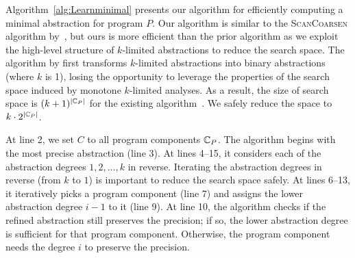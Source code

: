 Algorithm~\ref{alg:Learnminimal} presents our algorithm for efficiently computing a minimal abstraction for program $P$.
Our algorithm is similar to the \textsc{ScanCoarsen} algorithm by~\cite{Liang2011learning}, but ours is more efficient than the prior algorithm as we exploit the high-level structure of $k$-limited abstractions to reduce the search space.
The algorithm by \cite{Liang2011learning} first transforms $k$-limited abstractions into binary abstractions (where $k$ is 1), losing the opportunity to leverage the properties of the search space induced by monotone $k$-limited analyses.
As a result, the size of search space is $(k+1)^{|\mathbb{C}_P|}$ for the existing algorithm~\cite{Liang2011learning}.
We safely reduce the space to $k\cdot 2^{|\mathbb{C}_P|}$.


At line 2, we set $C$ to all program components $\mathbb{C}_P$.
The algorithm begins with the most precise abstraction (line 3).
At lines 4--15, it considers each of the abstraction degrees $1, 2, \dots, k$ in reverse.
Iterating the abstraction degrees in reverse (from $k$ to $1$) is important to reduce the search space safely.
At lines 6--13, it iteratively picks a program component (line 7) and assigns the lower abstraction degree $i-1$ to it (line 9).
At line 10, the algorithm checks if the refined abstraction still preserves the precision;
if so, the lower abstraction degree is sufficient for that program component.
Otherwise, the program component needs the degree $i$ to preserve the precision.
